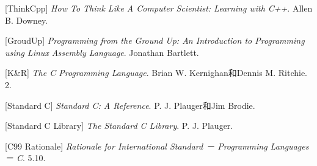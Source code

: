 

%
\begin{BookBibliographyEntry}

[ThinkCpp] \emph{How To Think Like A Computer Scientist:\BookSplit{} Learning with C+\BookSplit{}+\BookSplit{}}. Allen B.\BookSplit{} Downey.

\end{BookBibliographyEntry}

\begin{BookBibliographyEntry}

[GroudUp] \emph{Programming from the Ground Up:\BookSplit{} An Introduction to Programming using Linux Assembly Language}. Jonathan Bartlett.

\end{BookBibliographyEntry}

\begin{BookBibliographyEntry}

[K\&R] \emph{The C Programming Language}. Brian W.\BookSplit{} Kernighan和Dennis M.\BookSplit{} Ritchie. 2.\BookSplit{}

\end{BookBibliographyEntry}

\begin{BookBibliographyEntry}

[Standard C] \emph{Standard C:\BookSplit{} A Reference}. P.\BookSplit{} J.\BookSplit{} Plauger和Jim Brodie.

\end{BookBibliographyEntry}

\begin{BookBibliographyEntry}

[Standard C Library] \emph{The Standard C Library}. P.\BookSplit{} J.\BookSplit{} Plauger.

\end{BookBibliographyEntry}

\begin{BookBibliographyEntry}

[C99 Rationale] \emph{Rationale for International Standard － Programming Languages － C}. 5.\BookSplit{}10.\BookSplit{}

\end{BookBibliographyEntry}

